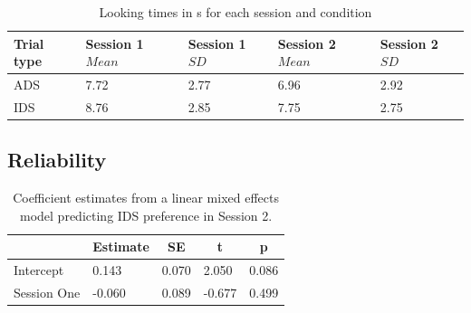 \documentclass[
  man,floatsintext]{apa6}
\begin{document}
\begin{table}[tbp]

\begin{center}
\begin{threeparttable}

\caption{\label{tab:descriptives_table1}Looking times in s for each session and condition}

\begin{tabular}{lllll}
\toprule
Trial type & Session 1 $Mean$ & Session 1 $SD$ & Session 2 $Mean$ & Session 2 $SD$\\
\midrule
ADS & 7.72 & 2.77 & 6.96 & 2.92\\
IDS & 8.76 & 2.85 & 7.75 & 2.75\\
\bottomrule
\end{tabular}

\end{threeparttable}
\end{center}

\end{table}

\hypertarget{reliability}{%
\subsection{Reliability}\label{reliability}}

\begin{table}[tbp]

\begin{center}
\begin{threeparttable}

\caption{\label{tab:coef_table2}Coefficient estimates from a linear mixed effects model predicting IDS preference in Session 2.}

\begin{tabular}{lllll}
\toprule
 & \multicolumn{1}{c}{Estimate} & \multicolumn{1}{c}{SE} & \multicolumn{1}{c}{t} & \multicolumn{1}{c}{p}\\
\midrule
Intercept & 0.143 & 0.070 & 2.050 & 0.086\\
Session One & -0.060 & 0.089 & -0.677 & 0.499\\
\bottomrule
\end{tabular}

\end{threeparttable}
\end{center}

\end{table}
\end{document}
